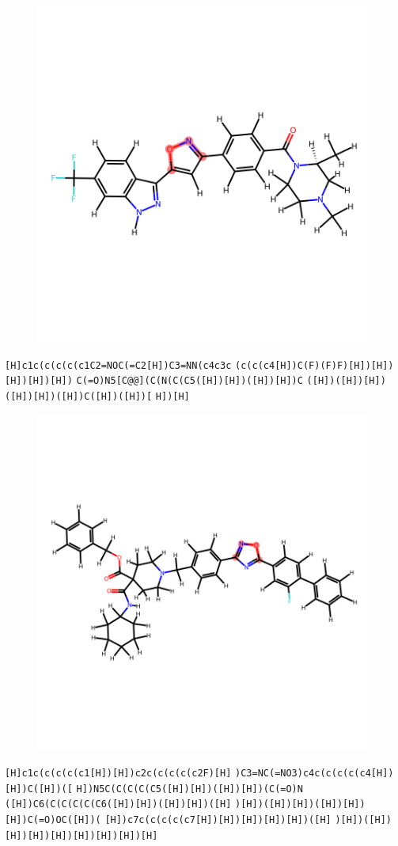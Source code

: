 \documentclass{article}
\begin{document}
\begin{figure}[ht]
\centering
    \includegraphics{mol98.png}
\end{figure}
\verb|[H]c1c(c(c(c(c1C2=NOC(=C2[H])C3=NN(c4c3c| \verb|(c(c(c4[H])C(F)(F)F)[H])[H])[H])[H])[H])| \verb|C(=O)N5[C@@](C(N(C(C5([H])[H])([H])[H])C| \verb|([H])([H])[H])([H])[H])([H])C([H])([H])[| \verb|H])[H]|

\begin{figure}[ht]
\centering
    \includegraphics{mol99.png}
\end{figure}
\verb|[H]c1c(c(c(c(c1[H])[H])c2c(c(c(c(c2F)[H]| \verb|)C3=NC(=NO3)c4c(c(c(c(c4[H])[H])C([H])([| \verb|H])N5C(C(C(C(C5([H])[H])([H])[H])(C(=O)N| \verb|([H])C6(C(C(C(C(C6([H])[H])([H])[H])([H]| \verb|)[H])([H])[H])([H])[H])[H])C(=O)OC([H])(| \verb|[H])c7c(c(c(c(c7[H])[H])[H])[H])[H])([H]| \verb|)[H])([H])[H])[H])[H])[H])[H])[H])[H]|
\end{document}
